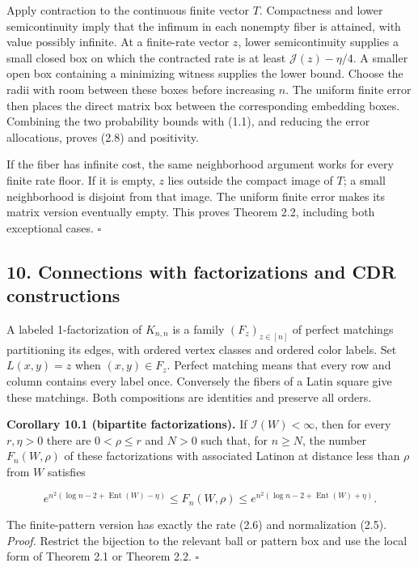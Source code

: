 \documentclass[english,11pt,a4paper]{article}
\newcounter{none}
\begin{document}
Apply contraction to the continuous finite vector \(T\). Compactness and lower semicontinuity imply that the infimum in each nonempty fiber is attained, with value possibly infinite. At a finite-rate vector \(z\), lower semicontinuity supplies a small closed box on which the contracted rate is at least \(\mathcal J(z)-\eta/4\). A smaller open box containing a minimizing witness supplies the lower bound. Choose the radii with room between these boxes before increasing \(n\). The uniform finite error then places the direct matrix box between the corresponding embedding boxes. Combining the two probability bounds with (1.1), and reducing the error allocations, proves (2.8) and positivity.

If the fiber has infinite cost, the same neighborhood argument works for every finite rate floor. If it is empty, \(z\) lies outside the compact image of \(T\); a small neighborhood is disjoint from that image. The uniform finite error makes its matrix version eventually empty. This proves Theorem 2.2, including both exceptional cases. \(\square\)

\subsection{10. Connections with factorizations and CDR constructions}\label{connections-with-factorizations-and-cdr-constructions}

A labeled 1-factorization of \(K_{n,n}\) is a family \((F_z)_{z\in[n]}\) of perfect matchings partitioning its edges, with ordered vertex classes and ordered color labels. Set \(L(x,y)=z\) when \((x,y)\in F_z\). Perfect matching means that every row and column contains every label once. Conversely the fibers of a Latin square give these matchings. Both compositions are identities and preserve all orders.

\textbf{Corollary 10.1 (bipartite factorizations).} If \(\mathcal I(W)<\infty\), then for every \(r,\eta>0\) there are \(0<\rho\le r\) and \(N>0\) such that, for \(n\ge N\), the number \(F_n(W,\rho)\) of these factorizations with associated Latinon at distance less than \(\rho\) from \(W\) satisfies

\nopagebreak[4]
\[e^{n^2(\log n-2+\operatorname{Ent}(W)-\eta)}\le F_n(W,\rho)
\le e^{n^2(\log n-2+\operatorname{Ent}(W)+\eta)}.\tag{10.1}\]

The finite-pattern version has exactly the rate (2.6) and normalization (2.5). \emph{Proof.} Restrict the bijection to the relevant ball or pattern box and use the local form of Theorem 2.1 or Theorem 2.2. \(\square\)
\end{document}
